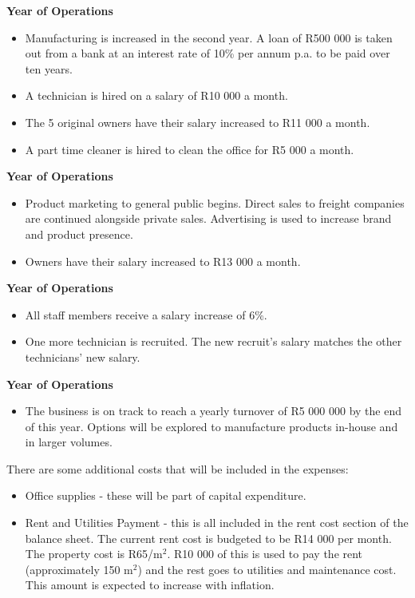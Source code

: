 {\bfseries {} Year of Operations}
\begin{itemize}
\item Manufacturing is increased in the second year. A loan of R500 000 is taken out from a bank at an interest rate of 10\% per annum p.a. to be paid over ten years. 
\item A technician is hired on a salary of R10 000 a month.
\item The 5 original owners have their salary increased to R11 000 a month.
\item A part time cleaner is hired to clean the office for R5 000 a month.
\end{itemize}
\pagebreak
{\bfseries {} Year of Operations}
\begin{itemize}
\item Product marketing to general public begins. Direct sales to freight companies are continued alongside private sales. Advertising is used to increase brand and product presence.
\item Owners have their salary increased to R13 000 a month.
\end{itemize}

{\bfseries {} Year of Operations}
\begin{itemize}
\item All staff members receive a salary increase of 6\%.
\item One more technician is recruited. The new recruit's salary matches the other technicians' new salary.
\end{itemize}

{\bfseries {} Year of Operations}
\begin{itemize}
\item The business is on track to reach a yearly turnover of R5 000 000 by the end of this year. Options will be explored to manufacture products in-house and in larger volumes.
\end{itemize}

There are some additional costs that will be included in the expenses:
\begin{itemize}
\item Office supplies - these will be part of capital expenditure.
\item Rent and Utilities Payment - this is all included in the rent cost section of the balance sheet. The current rent cost is budgeted to be R14 000 per month. The property cost is R65/m$^2$. R10 000 of this is used to pay the rent (approximately 150 m$^2$) and the rest goes to utilities and maintenance cost. This amount is expected to increase with inflation. 
\end{itemize}


